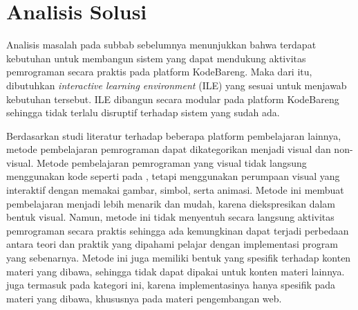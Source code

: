 

\section{Analisis Solusi}
Analisis masalah pada subbab sebelumnya menunjukkan bahwa terdapat kebutuhan untuk membangun sistem yang dapat mendukung aktivitas pemrograman secara praktis pada platform KodeBareng. Maka dari itu, dibutuhkan \textit{interactive learning environment} (ILE) yang sesuai untuk menjawab kebutuhan tersebut. ILE dibangun secara modular pada platform KodeBareng sehingga tidak terlalu disruptif terhadap sistem yang sudah ada.

Berdasarkan studi literatur terhadap beberapa platform pembelajaran lainnya, metode pembelajaran pemrograman dapat dikategorikan menjadi visual dan non-visual. Metode pembelajaran pemrograman yang visual tidak langsung menggunakan kode seperti pada \textcite{brilliant2021media}, tetapi menggunakan perumpaan visual yang interaktif dengan memakai gambar, simbol, serta animasi. Metode ini membuat pembelajaran menjadi lebih menarik dan mudah, karena diekspresikan dalam bentuk visual. Namun, metode ini tidak menyentuh secara langsung aktivitas pemrograman secara praktis sehingga ada kemungkinan dapat terjadi perbedaan antara teori dan praktik yang dipahami pelajar dengan implementasi program yang sebenarnya. Metode ini juga memiliki bentuk yang spesifik terhadap konten materi yang dibawa, sehingga tidak dapat dipakai untuk konten materi lainnya. \textcite{froggy2021media} juga termasuk pada kategori ini, karena implementasinya hanya spesifik pada materi yang dibawa, khususnya pada materi pengembangan web.

